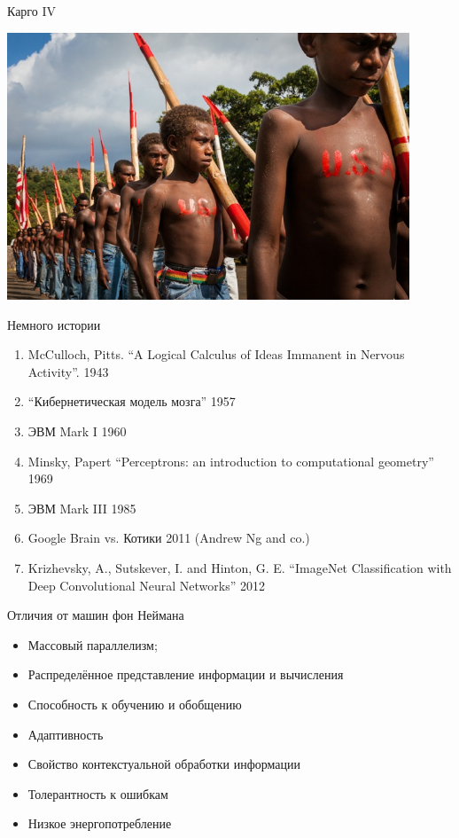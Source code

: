 \documentclass[14pt, fleqn, xcolor={dvipsnames, table}]{beamer}
\begin{document}
\begin{frame}{Карго IV}
\begin{center}
\includegraphics[width=0.9\textwidth]{cargo_3}
\end{center}
\end{frame}


\begin{frame}{Немного истории}
\begin{enumerate}
  \item McCulloch, Pitts. ``A Logical Calculus of Ideas Immanent in Nervous Activity''. 1943
  \item ``Кибернетическая модель мозга'' 1957
  \item ЭВМ Mark I 1960
  \item Minsky, Papert ``Perceptrons: an introduction to computational geometry'' 1969
  \item ЭВМ Mark III 1985
  \item Google Brain vs. Котики 2011 (Andrew Ng and co.)
  \item Krizhevsky, A., Sutskever, I. and Hinton, G. E. ``ImageNet Classification with Deep Convolutional Neural Networks'' 2012
\end{enumerate}

\end{frame}

\begin{frame}{Отличия от машин фон Неймана}
\begin{itemize}
  \item Массовый параллелизм;
  \item Распределённое представление информации и вычисления
  \item Способность к обучению и обобщению
  \item Адаптивность
  \item Свойство контекстуальной обработки информации
  \item Толерантность к ошибкам
  \item Низкое энергопотребление
\end{itemize}
\end{frame}
\end{document}
